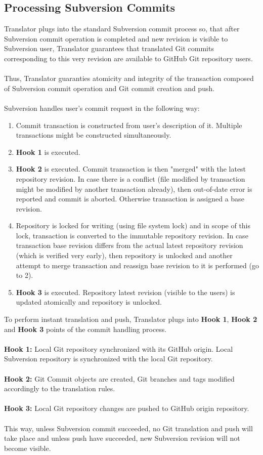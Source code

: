 \subsection{Processing Subversion Commits}

Translator plugs into the standard Subversion commit process so, that after Subversion commit operation
is completed and new revision is visible to Subversion user, Translator guarantees that translated Git commits
corresponding to this very revision are available to GitHub Git repository users.
\\\\
Thus, Translator guaranties atomicity and integrity of the transaction composed of Subversion commit operation
and Git commit creation and push.
\\\\
Subversion handles user's commit request in the following way:

\begin{enumerate}
\compactlist
\item Commit transaction is constructed from user's description of it. Multiple transactions might be constructed simultaneously.
\item \textbf{Hook 1} is executed.
\item \textbf{Hook 2} is executed. Commit transaction is then "merged" with the latest repository revision. In case there is a conflict (file modified by transaction might be modified by another transaction already), then out-of-date error is reported and commit is aborted. Otherwise transaction is assigned a base revision.
\item Repository is locked for writing (using file system lock) and in scope of this lock, transaction is converted to the immutable repository revision. In case transaction base revision differs from the actual latest repository revision (which is verified very early), then repository is unlocked and another attempt to merge transaction and reassign base revision to it is performed (go to 2).
\item \textbf{Hook 3} is executed. Repository latest revision (visible to the users) is updated atomically and repository is unlocked.
\end{enumerate}
To perform instant translation and push, Translator plugs into \textbf{Hook 1}, \textbf{Hook 2} and \textbf{Hook 3} points of the commit handling process.
\\\\
\textbf{Hook 1:} Local Git repository synchronized with its GitHub origin. Local Subversion repository is synchronized with the local Git repository.
\\\\
\textbf{Hook 2:} Git Commit objects are created, Git branches and tags modified accordingly to the translation rules.
\\\\
\textbf{Hook 3:} Local Git repository changes are pushed to GitHub origin repository.
\\\\
This way, unless Subversion commit succeeded, no Git translation and push will take place and unless push have succeeded, new Subversion revision will not become visible.
